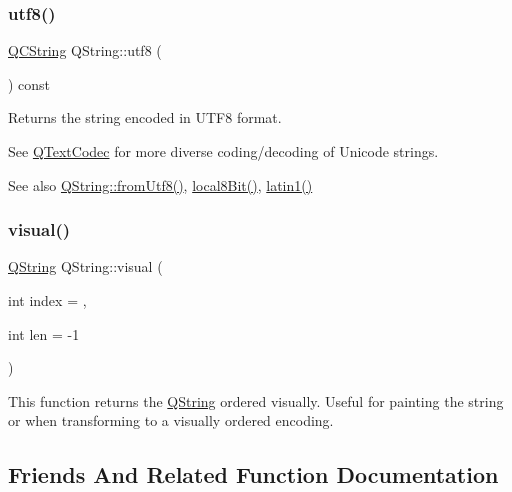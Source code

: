 \subsubsection{\texorpdfstring{utf8()}{utf8()}}
{\footnotesize\ttfamily \mbox{\hyperlink{class_q_c_string}{Q\+C\+String}} Q\+String\+::utf8 (\begin{DoxyParamCaption}{ }\end{DoxyParamCaption}) const}

Returns the string encoded in U\+T\+F8 format.

See \mbox{\hyperlink{class_q_text_codec}{Q\+Text\+Codec}} for more diverse coding/decoding of Unicode strings.

\begin{DoxySeeAlso}{See also}
\mbox{\hyperlink{class_q_string_a3e1b40400c137f234bfd2fd73405bca7}{Q\+String\+::from\+Utf8()}}, \mbox{\hyperlink{class_q_string_ac8aa3324210f474d9f515ba9f80b0f68}{local8\+Bit()}}, \mbox{\hyperlink{class_q_string_af9cb186d8ba117c42f31e8235478fe68}{latin1()}} 
\end{DoxySeeAlso}
\mbox{\label{class_q_string_aaadfa2ae50754aa87fed66d04b4f8e2b}} 
\subsubsection{\texorpdfstring{visual()}{visual()}}
{\footnotesize\ttfamily \mbox{\hyperlink{class_q_string}{Q\+String}} Q\+String\+::visual (\begin{DoxyParamCaption}\item[{int}]{index = {},  }\item[{int}]{len = {\ttfamily -\/1} }\end{DoxyParamCaption})}

This function returns the \mbox{\hyperlink{class_q_string}{Q\+String}} ordered visually. Useful for painting the string or when transforming to a visually ordered encoding. 

\subsection{Friends And Related Function Documentation}
\mbox{\label{class_q_string_aba83e5b91872eeb6af5f55d7b96ab50b}} 
